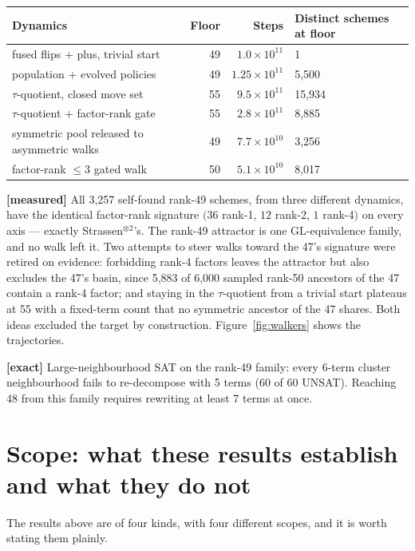 \documentclass[11pt]{article}
\newcommand{\GL}{\mathrm{GL}}
\begin{document}
\begin{center}
\begin{tabular}{lrrl}
\toprule
Dynamics & Floor & Steps & Distinct schemes at floor \\
\midrule
fused flips + plus, trivial start & 49 & $1.0\times10^{11}$ & 1 \\
population + evolved policies & 49 & $1.25\times10^{11}$ & 5{,}500 \\
$\tau$-quotient, closed move set & 55 & $9.5\times10^{11}$ & 15{,}934 \\
$\tau$-quotient + factor-rank gate & 55 & $2.8\times10^{11}$ & 8{,}885 \\
symmetric pool released to asymmetric walks & 49 & $7.7\times10^{10}$ & 3{,}256 \\
factor-rank $\leq3$ gated walk & 50 & $5.1\times10^{10}$ & 8{,}017 \\
\bottomrule
\end{tabular}
\end{center}

\textbf{[measured]} All 3{,}257 self-found rank-49 schemes, from three different dynamics, have the
identical factor-rank signature $(36$ rank-1, $12$ rank-2, $1$ rank-4$)$ on every axis --- exactly
Strassen$^{\otimes2}$'s. The rank-49 attractor is one $\GL$-equivalence family, and no walk left it.
Two attempts to steer walks toward the 47's signature were retired on evidence: forbidding rank-4 factors
leaves the attractor but also excludes the 47's basin, since 5{,}883 of 6{,}000 sampled rank-50 ancestors
of the 47 contain a rank-4 factor; and staying in the $\tau$-quotient from a trivial start plateaus at 55
with a fixed-term count that no symmetric ancestor of the 47 shares. Both ideas excluded the target by
construction. Figure~\ref{fig:walkers} shows the trajectories.

\textbf{[exact]} Large-neighbourhood SAT on the rank-49 family: every 6-term cluster neighbourhood fails
to re-decompose with 5 terms (60 of 60 UNSAT). Reaching 48 from this family requires rewriting at least 7
terms at once.

\section{Scope: what these results establish and what they do not}
\label{sec:scope}

The results above are of four kinds, with four different scopes, and it is worth stating them plainly.
\end{document}

